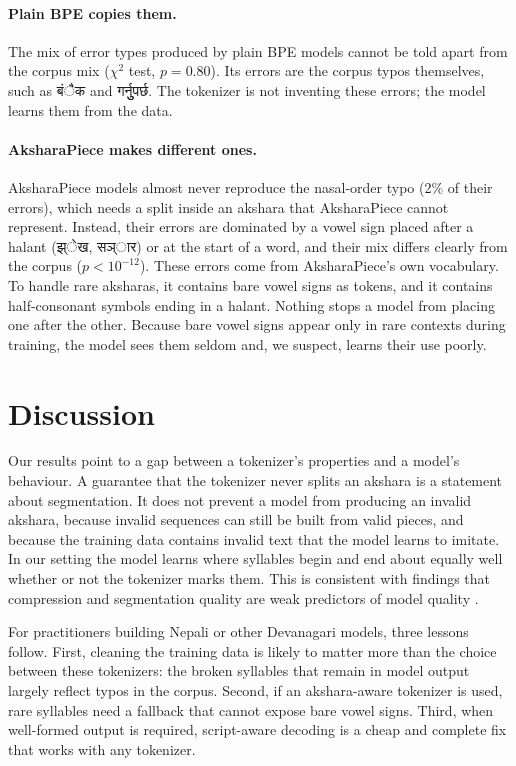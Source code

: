 \documentclass[11pt]{article}
\newcommand{\np}[1]{{\devfont #1}}                               %
\newcommand{\ap}{AksharaPiece}
\begin{document}
\paragraph{Plain BPE copies them.} The mix of error types produced by plain BPE models cannot be told apart from the corpus mix ($\chi^2$ test, $p=0.80$). Its errors are the corpus typos themselves, such as \np{बंैक} and \np{गर्नुुपर्छ}. The tokenizer is not inventing these errors; the model learns them from the data.

\paragraph{\ap{} makes different ones.} \ap{} models almost never reproduce the nasal-order typo (2\% of their errors), which needs a split inside an akshara that \ap{} cannot represent. Instead, their errors are dominated by a vowel sign placed after a halant (\np{झ्ेख}, \np{सञ्ार}) or at the start of a word, and their mix differs clearly from the corpus ($p<10^{-12}$). These errors come from \ap{}'s own vocabulary. To handle rare aksharas, it contains bare vowel signs as tokens, and it contains half-consonant symbols ending in a halant. Nothing stops a model from placing one after the other. Because bare vowel signs appear only in rare contexts during training, the model sees them seldom and, we suspect, learns their use poorly.

\section{Discussion}

Our results point to a gap between a tokenizer's properties and a model's behaviour. A guarantee that the tokenizer never splits an akshara is a statement about segmentation. It does not prevent a model from producing an invalid akshara, because invalid sequences can still be built from valid pieces, and because the training data contains invalid text that the model learns to imitate. In our setting the model learns where syllables begin and end about equally well whether or not the tokenizer marks them. This is consistent with findings that compression and segmentation quality are weak predictors of model quality \citep{schmidt-etal-2024-tokenization,ali-etal-2024-tokenizer}.

For practitioners building Nepali or other Devanagari models, three lessons follow. First, cleaning the training data is likely to matter more than the choice between these tokenizers: the broken syllables that remain in model output largely reflect typos in the corpus. Second, if an akshara-aware tokenizer is used, rare syllables need a fallback that cannot expose bare vowel signs. Third, when well-formed output is required, script-aware decoding is a cheap and complete fix that works with any tokenizer.
\end{document}
